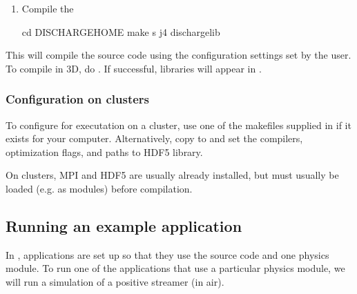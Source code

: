 \documentclass[letterpaper,10pt,english]{sphinxmanual}
\begin{document}
\begin{enumerate}
\begin{itemize}
\begin{sphinxVerbatim}[commandchars=\\\{\},formatcom=\scriptsize]
cp \PYGZdl{}DISCHARGE\PYGZus{}HOME/Lib/Local/Make.defs.MPI.HDF5.GNU \PYGZdl{}CHOMBO\PYGZus{}HOME/mk/Make.defs.local
\end{sphinxVerbatim}

\end{itemize}

\item {} 
Compile the 

\begin{sphinxVerbatim}[commandchars=\\\{\},formatcom=\scriptsize]
cd \PYGZdl{}DISCHARGE\PYGZus{}HOME
make \PYGZhy{}s \PYGZhy{}j4 discharge\PYGZhy{}lib
\end{sphinxVerbatim}

\end{enumerate}

This will compile the  source code using the configuration settings set by the user.
To compile  in 3D, do .
If successful,  libraries will appear in .


\subsubsection{Configuration on clusters}
\label{\detokenize{Base/Installation:configuration-on-clusters}}
To configure  for executation on a cluster, use one of the makefiles supplied in  if it exists for your computer.
Alternatively, copy  to  and set the compilers, optimization flags, and paths to HDF5 library.

On clusters, MPI and HDF5 are usually already installed, but must usually be loaded (e.g. as modules) before compilation.


\subsection{Running an example application}
\label{\detokenize{Base/Installation:running-an-example-application}}
In , applications are set up so that they use the  source code and one  physics module.
To run one of the applications that use a particular  physics module, we will run a simulation of a positive streamer (in air).
\end{document}
